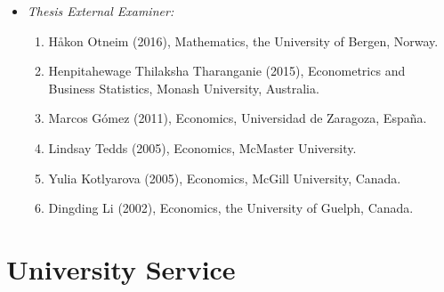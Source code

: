 \documentclass[
]{article}
\begin{document}
\begin{itemize}
\begin{enumerate}
    {[}NB - from 1993-2002 I was a faculty member in the Department of
    Economics at the University of South Florida and, at that time, they
    did not have a Ph.D.~program{]}
  \item
    Papanastasiou, John (1992, Economics, York, currently on faculty at
    the University of Macedonia, Thessaloniki, Greece)
  \end{enumerate}
\item
  \emph{Thesis External Examiner:}

  \begin{enumerate}
  \def\labelenumi{\arabic{enumi}.}
  \item
    Håkon Otneim (2016), Mathematics, the University of Bergen, Norway.
  \item
    Henpitahewage Thilaksha Tharanganie (2015), Econometrics and
    Business Statistics, Monash University, Australia.
  \item
    Marcos Gómez (2011), Economics, Universidad de Zaragoza, España.
  \item
    Lindsay Tedds (2005), Economics, McMaster University.
  \item
    Yulia Kotlyarova (2005), Economics, McGill University, Canada.
  \item
    Dingding Li (2002), Economics, the University of Guelph, Canada.
  \end{enumerate}
\end{itemize}

\section*{University Service}\label{university-service}
\end{document}
